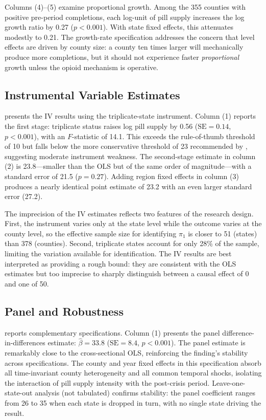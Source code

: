 \documentclass[12pt]{article}
\begin{document}
Columns (4)--(5) examine proportional growth. Among the 355 counties with positive pre-period completions, each log-unit of pill supply increases the log growth ratio by 0.27 ($p < 0.001$). With state fixed effects, this attenuates modestly to 0.21. The growth-rate specification addresses the concern that level effects are driven by county size: a county ten times larger will mechanically produce more completions, but it should not experience faster \textit{proportional} growth unless the opioid mechanism is operative.




\subsection{Instrumental Variable Estimates}

 presents the IV results using the triplicate-state instrument. Column (1) reports the first stage: triplicate status raises log pill supply by 0.56 ($\text{SE} = 0.14$, $p < 0.001$), with an $F$-statistic of 14.1. This exceeds the \citet{stock2005} rule-of-thumb threshold of 10 but falls below the more conservative threshold of 23 recommended by \citet{lee2022}, suggesting moderate instrument weakness. The second-stage estimate in column (2) is 23.8---smaller than the OLS but of the same order of magnitude---with a standard error of 21.5 ($p = 0.27$). Adding region fixed effects in column (3) produces a nearly identical point estimate of 23.2 with an even larger standard error (27.2).

The imprecision of the IV estimates reflects two features of the research design. First, the instrument varies only at the state level while the outcome varies at the county level, so the effective sample size for identifying $\pi_1$ is closer to 51 (states) than 378 (counties). Second, triplicate states account for only 28\% of the sample, limiting the variation available for identification. The IV results are best interpreted as providing a rough bound: they are consistent with the OLS estimates but too imprecise to sharply distinguish between a causal effect of 0 and one of 50.




\subsection{Panel and Robustness}

 reports complementary specifications. Column (1) presents the panel difference-in-differences estimate: $\hat{\beta} = 33.8$ ($\text{SE} = 8.4$, $p < 0.001$). The panel estimate is remarkably close to the cross-sectional OLS, reinforcing the finding's stability across specifications. The county and year fixed effects in this specification absorb all time-invariant county heterogeneity and all common temporal shocks, isolating the interaction of pill supply intensity with the post-crisis period. Leave-one-state-out analysis (not tabulated) confirms stability: the panel coefficient ranges from 26 to 35 when each state is dropped in turn, with no single state driving the result.
\end{document}
